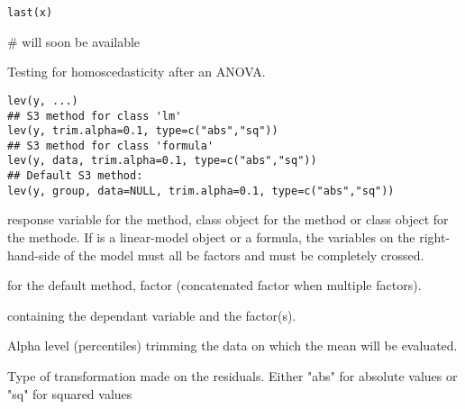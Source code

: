 \documentclass[a4paper]{book}
\begin{document}
\newpage
{}
%
\begin{Usage}
\begin{verbatim}
last(x)
\end{verbatim}
\end{Usage}
%
\begin{Arguments}
\begin{ldescription}
\item[\code{x}] 


\end{ldescription}
\end{Arguments}
%
\begin{Examples}
\begin{ExampleCode}
# will soon be available
\end{ExampleCode}
\end{Examples}
\newpage
{}
%
\begin{Description}\relax
Testing for homoscedasticity after an ANOVA.
\end{Description}
%
\begin{Usage}
\begin{verbatim}
lev(y, ...)
## S3 method for class 'lm'
lev(y, trim.alpha=0.1, type=c("abs","sq"))
## S3 method for class 'formula'
lev(y, data, trim.alpha=0.1, type=c("abs","sq"))
## Default S3 method:
lev(y, group, data=NULL, trim.alpha=0.1, type=c("abs","sq"))
\end{verbatim}
\end{Usage}
%
\begin{Arguments}
\begin{ldescription}
\item[\code{y}] response variable for the  method, 
class object for the  method or 
class object for the  methode. If 
is a linear-model object or a formula, the variables on the right-hand-side
of the model must all be factors and must be completely crossed.
\item[\code{group}] for the default method, factor (concatenated factor when multiple factors).
\item[\code{data}]  containing the dependant variable and the factor(s).
\item[\code{trim.alpha}] Alpha level (percentiles) trimming the data on which the mean will be evaluated.
\item[\code{type}] Type of transformation made on the residuals. Either "abs" for absolute values or "sq" for squared values
\end{ldescription}
\end{Arguments}
\end{document}
